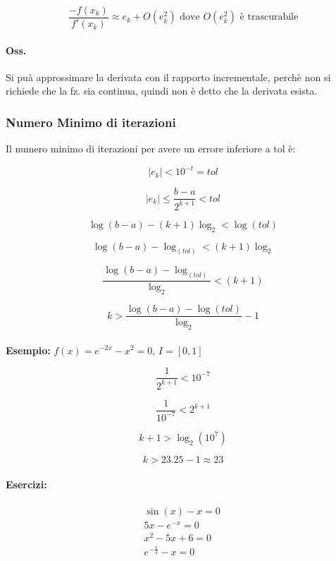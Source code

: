 \documentclass[a4paper, 11pt]{article}
\begin{document}
        \[
            \frac{-f(x_k)}{f'(x_k)} \approx e_k + O(e_k^2) \text{ dove $O(e_k^2)$ è trascurabile}
        \]

        \paragraph{Oss. } Si puà approssimare la derivata con il rapporto incrementale, perchè non si richiede che la fz. sia continua, quindi non è detto che la derivata esista. 


        \subsubsection{Numero Minimo di iterazioni}
        Il numero minimo di iterazioni per avere un errore inferiore a tol è:

        \[
            |e_k| < 10^{-t} = tol
        \]

        \[
            |e_k| \le \frac{b-a}{2^{k+1}} < tol   
        \]

        \[
            \log(b-a) - (k+1)\log_2 < \log(tol)
        \]

        \[
            \log(b-a) - \log_(tol) < (k+1)\log_2
        \]

        \[
            \frac{\log(b-a)-\log_(tol)}{\log_2} < (k+1)
        \]

        \[
            k > \frac{\log(b-a)-\log(tol)}{\log_2} -1
        \]
    

        \paragraph{}
        \textbf{Esempio:} $f(x) = e^{-2x}-x^2 = 0$, $I = [0,1]$
        
        \[
            \frac{1}{2^{k+1}} < 10^{-7}
        \]

        \[
            \frac{1}{10^{-7}} < 2^{k+1}
        \]

        \[
            k+1 > \log_2(10^7)
        \]

        \[
            k > 23.25 -1 \approx 23
        \]

        \paragraph{Esercizi: }

        \begin{align*}
            & \sin(x) - x = 0 \quad \\
            & 5x - e^{-x} = 0 \quad \\
            & x^2 - 5x + 6 = 0 \quad \\
            & e^{-\frac{x}{4}} - x = 0 \quad
        \end{align*}
\end{document}
